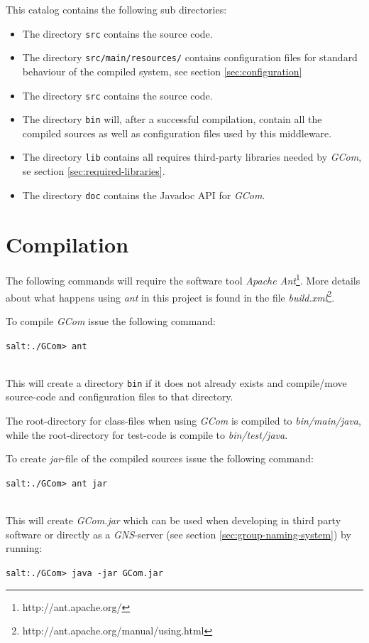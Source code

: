 \documentclass[titlepage, twocolumn, a4paper, 10pt]{article}
\begin{document}
This catalog contains the following sub directories:
\begin{itemize}
\item The directory \verb!src! contains the source code.
\item The directory \verb!src/main/resources/! contains configuration
  files for standard behaviour of the compiled system, see section
  \ref{sec:configuration}
\item The directory \verb!src! contains the source code.
\item The directory \verb!bin! will, after a successful compilation,
  contain all the compiled sources as well as configuration files used
  by this middleware.
\item The directory \verb!lib! contains all requires third-party libraries
  needed by \textit{GCom}, se section \ref{sec:required-libraries}.
\item The directory \verb!doc! contains the Javadoc API for \textit{GCom}.
\end{itemize}

\section{Compilation}\label{sec:compilation}
The following commands will require the software tool \textit{Apache
  Ant}\footnote{http://ant.apache.org/}. More details about what
happens using \textit{ant} in this project is found in the file
\textit{build.xml}\footnote{http://ant.apache.org/manual/using.html}.

To compile \textit{GCom} issue the following command:\\
\begin{footnotesize}
  \verb!salt:./GCom> ant!
\end{footnotesize}\\
This will create a directory \verb!bin! if it does not already exists
and compile/move source-code and configuration files to that
directory.

The root-directory for class-files when using \textit{GCom} is
compiled to \textit{bin/main/java}, while the root-directory for
test-code is compile to \textit{bin/test/java}.

To create \textit{jar}-file of the compiled sources issue the
following command:\\
\begin{footnotesize}
  \verb!salt:./GCom> ant jar!
\end{footnotesize}\\
This will create \textit{GCom.jar} which can be used when developing
in third party software or directly as a \textit{GNS}-server (see
section \ref{sec:group-naming-system}) by
running:\\
\begin{footnotesize}
  \verb!salt:./GCom> java -jar GCom.jar!
\end{footnotesize}
\end{document}
